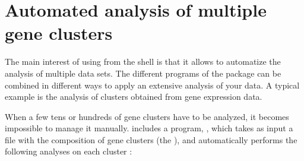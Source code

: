 \chapter{Automated analysis of multiple gene clusters}

The main interest of using \RSAT from the shell is that it allows to
automatize the analysis of multiple data sets. The different programs
of the package can be combined in different ways to apply an extensive
analysis of your data. A typical example is the analysis of clusters
obtained from gene expression data.

When a few tens or hundreds of gene clusters have to be analyzed, it
becomes impossible to manage it manually. \RSAT includes a program,
, which takes as input a file with
the composition of gene clusters (the ), and
automatically performs the following analyses on each cluster :

